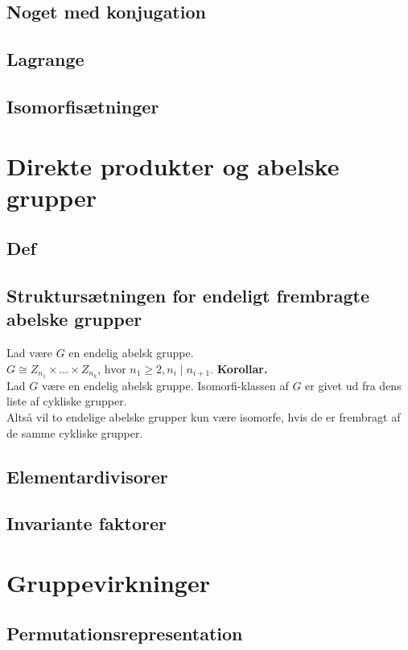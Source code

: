 \documentclass[11pt]{article}
\begin{document}
\subsection*{Noget med konjugation}

\subsection*{Lagrange}

\subsection*{Isomorfisætninger}

\section*{Direkte produkter og abelske grupper}
\subsection*{Def}
\subsection*{Struktursætningen for endeligt frembragte abelske grupper}

Lad være $G$ en endelig abelsk gruppe.\\
$G \cong Z_{n_1} \times \hdots \times Z_{n_k}$, hvor $n_1 \geq 2, n_i \mid n_{i+1}$.
\textbf{Korollar.}\\
Lad $G$ være en endelig abelsk gruppe. Isomorfi-klassen af $G$ er givet ud fra dens liste af cykliske grupper.\\
Altså vil to endelige abelske grupper kun være isomorfe, hvis de er frembragt af de samme cykliske grupper.

\subsection*{Elementardivisorer}

\subsection*{Invariante faktorer}

\section*{Gruppevirkninger}
\subsection*{Permutationsrepresentation}
\end{document}
